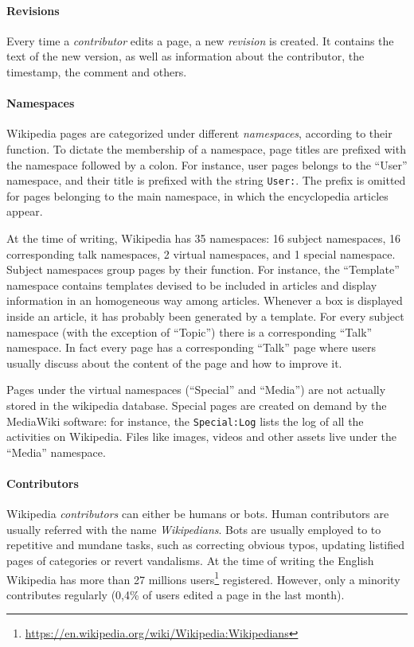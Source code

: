 \paragraph{Revisions}
Every time a \emph{contributor} edits a page, a new \emph{revision} is created.
It contains the text of the new version, as well as information about the contributor, the timestamp, the comment and others.

\paragraph{Namespaces}
Wikipedia pages are categorized under different \emph{namespaces}, according to their function.
To dictate the membership of a namespace, page titles are prefixed with the namespace followed by a colon.
For instance, user pages belongs to the ``User'' namespace, and their title is prefixed with the string \texttt{User:}.
The prefix is omitted for pages belonging to the main namespace, in which the encyclopedia articles appear.

At the time of writing, Wikipedia has 35 namespaces: 16 subject namespaces, 16 corresponding talk namespaces, 2 virtual namespaces, and 1 special namespace.
Subject namespaces group pages by their function.
For instance, the ``Template'' namespace contains templates devised to be included in articles and display information in an homogeneous way among articles.
Whenever a box is displayed inside an article, it has probably been generated by a template.
For every subject namespace (with the exception of ``Topic'') there is a corresponding ``Talk'' namespace.
In fact every page has a corresponding ``Talk'' page where users usually discuss about the content of the page and how to improve it.


Pages under the virtual namespaces (``Special'' and ``Media'') are not actually stored in the wikipedia database.
Special pages are created on demand by the MediaWiki software: for instance, the \texttt{Special:Log} lists the log of all the activities on Wikipedia.
Files like images, videos and other assets live under the ``Media'' namespace.

\paragraph{Contributors}
Wikipedia \emph{contributors} can either be humans or bots.
Human contributors are usually referred with the name \emph{Wikipedians}.
Bots are usually employed to to repetitive and mundane tasks, such as correcting obvious typos, updating listified pages of categories or revert vandalisms.
At the time of writing the English Wikipedia has more than 27 millions users\footnote{\url{https://en.wikipedia.org/wiki/Wikipedia:Wikipedians}} registered.
However, only a minority contributes regularly (0,4\% of users edited a page in the last month).

